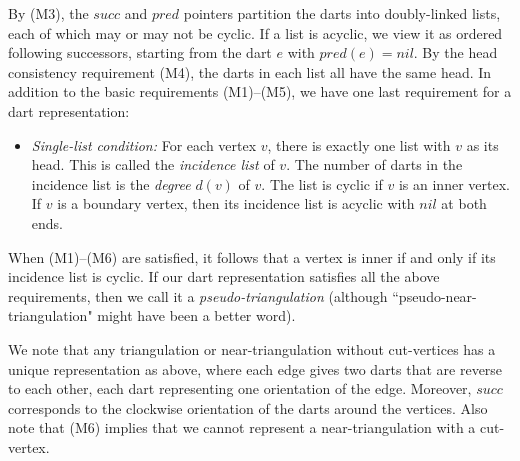 \documentclass[10pt,a4paper]{article}
\def\nil{\textit{nil}}
\def\successor{\textit{succ}}
\def\predecessor{\textit{pred}}
\begin{document}
By (M3), the $\successor$ and $\predecessor$ pointers partition the darts into doubly-linked
lists, each of which may or may not be cyclic. If a list is acyclic, we view it as ordered following successors, starting from the dart $e$ with $\predecessor(e)=\nil$.
By the head consistency requirement (M4), the darts in each list all have the same head. 
In addition to the basic requirements (M1)--(M5), we have one last requirement for a dart representation:
\begin{itemize}
    \item[(M6)] \emph{Single-list condition:}
    For each vertex $v$, there is exactly one list with $v$ as its head. This is called the \emph{incidence list} of $v$. The number of darts in the incidence list is the \emph{degree} $d(v)$ of $v$.
    The list is cyclic if $v$ is an inner vertex. If $v$ is a boundary vertex, then its incidence list is acyclic with  $\nil$ at both ends.
\end{itemize}
When (M1)--(M6) are satisfied, it follows that a vertex is inner if and only if its incidence list is cyclic. If our dart representation satisfies all the above requirements, then we call it a \emph{pseudo-triangulation}
(although ``pseudo-near-triangulation" might have been a better word).

We note that any triangulation or near-triangulation without cut-vertices has a unique representation as above, where each edge gives two darts that are reverse to each other, each dart representing one orientation of the edge. Moreover, $\successor$ corresponds to the clockwise orientation of the darts around the vertices. Also note that (M6) implies that we cannot represent a near-triangulation with a cut-vertex.
\end{document}
